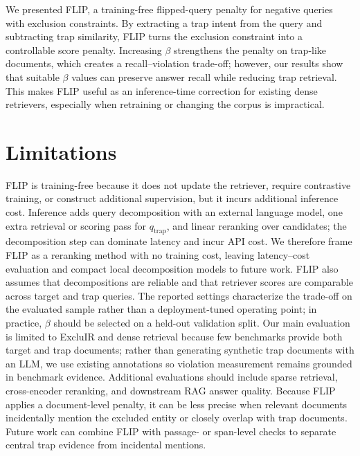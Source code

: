 \documentclass[11pt]{article}
\newcommand{\method}{FLIP\xspace}
\begin{document}
We presented \method, a training-free flipped-query penalty for negative queries with exclusion constraints.
By extracting a trap intent from the query and subtracting trap similarity, \method turns the exclusion constraint into a controllable score penalty.
Increasing $\beta$ strengthens the penalty on trap-like documents, which creates a recall--violation trade-off; however, our results show that suitable $\beta$ values can preserve answer recall while reducing trap retrieval.
This makes \method useful as an inference-time correction for existing dense retrievers, especially when retraining or changing the corpus is impractical.

\section*{Limitations}

\method is training-free because it does not update the retriever, require contrastive training, or construct additional supervision, but it incurs additional inference cost.
Inference adds query decomposition with an external language model, one extra retrieval or scoring pass for $q_{\mathrm{trap}}$, and linear reranking over candidates; the decomposition step can dominate latency and incur API cost.
We therefore frame \method as a reranking method with no training cost, leaving latency--cost evaluation and compact local decomposition models to future work.
\method also assumes that decompositions are reliable and that retriever scores are comparable across target and trap queries.
The reported settings characterize the trade-off on the evaluated sample rather than a deployment-tuned operating point; in practice, $\beta$ should be selected on a held-out validation split.
Our main evaluation is limited to ExcluIR and dense retrieval because few benchmarks provide both target and trap documents; rather than generating synthetic trap documents with an LLM, we use existing annotations so violation measurement remains grounded in benchmark evidence.
Additional evaluations should include sparse retrieval, cross-encoder reranking, and downstream RAG answer quality.
Because \method applies a document-level penalty, it can be less precise when relevant documents incidentally mention the excluded entity or closely overlap with trap documents.
Future work can combine \method with passage- or span-level checks to separate central trap evidence from incidental mentions.

\clearpage

\end{document}
